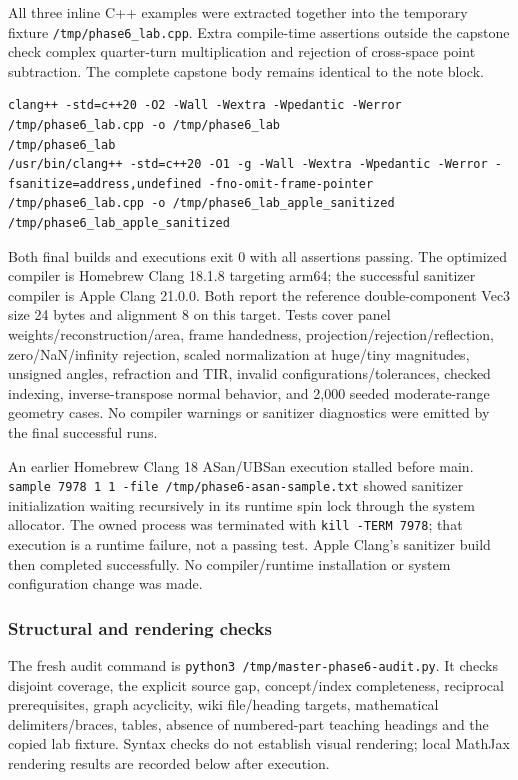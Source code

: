 All three inline C++ examples were extracted together into the temporary fixture \texttt{/tmp/phase6\_lab.cpp}. Extra compile-time assertions outside the capstone check complex quarter-turn multiplication and rejection of cross-space point subtraction. The complete capstone body remains identical to the note block.

\begin{verbatim}
clang++ -std=c++20 -O2 -Wall -Wextra -Wpedantic -Werror /tmp/phase6_lab.cpp -o /tmp/phase6_lab
/tmp/phase6_lab
/usr/bin/clang++ -std=c++20 -O1 -g -Wall -Wextra -Wpedantic -Werror -fsanitize=address,undefined -fno-omit-frame-pointer /tmp/phase6_lab.cpp -o /tmp/phase6_lab_apple_sanitized
/tmp/phase6_lab_apple_sanitized
\end{verbatim}

Both final builds and executions exit 0 with all assertions passing. The optimized compiler is Homebrew Clang 18.1.8 targeting arm64; the successful sanitizer compiler is Apple Clang 21.0.0. Both report the reference double-component Vec3 size 24 bytes and alignment 8 on this target. Tests cover panel weights/reconstruction/area, frame handedness, projection/rejection/reflection, zero/NaN/infinity rejection, scaled normalization at huge/tiny magnitudes, unsigned angles, refraction and TIR, invalid configurations/tolerances, checked indexing, inverse-transpose normal behavior, and 2,000 seeded moderate-range geometry cases. No compiler warnings or sanitizer diagnostics were emitted by the final successful runs.

An earlier Homebrew Clang 18 ASan/UBSan execution stalled before main. \texttt{sample\ 7978\ 1\ 1\ -file\ /tmp/phase6-asan-sample.txt} showed sanitizer initialization waiting recursively in its runtime spin lock through the system allocator. The owned process was terminated with \texttt{kill\ -TERM\ 7978}; that execution is a runtime failure, not a passing test. Apple Clang's sanitizer build then completed successfully. No compiler/runtime installation or system configuration change was made.

\subsubsection{Structural and rendering checks}\label{appendix-a103e7846d21-structural-and-rendering-checks}

The fresh audit command is \texttt{python3\ /tmp/master-phase6-audit.py}. It checks disjoint coverage, the explicit source gap, concept/index completeness, reciprocal prerequisites, graph acyclicity, wiki file/heading targets, mathematical delimiters/braces, tables, absence of numbered-part teaching headings and the copied lab fixture. Syntax checks do not establish visual rendering; local MathJax rendering results are recorded below after execution.

